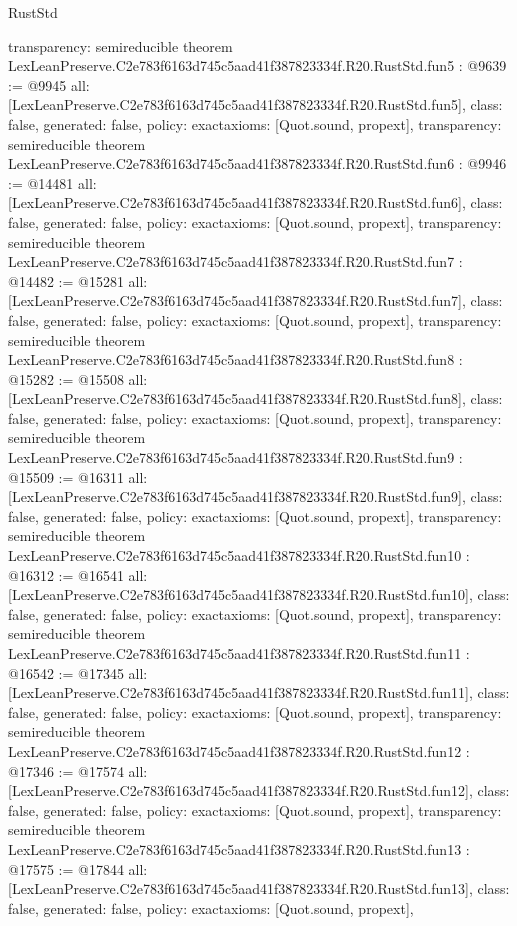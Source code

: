 \begin{lexlean}{RustStd}
\begin{coremodule}
{  transparency: semireducible
}
theorem LexLeanPreserve.C2e783f6163d745c5aad41f387823334f.R20.RustStd.fun5 : @9639 := @9945 {
  all: [LexLeanPreserve.C2e783f6163d745c5aad41f387823334f.R20.RustStd.fun5],
  class: false,
  generated: false,
  policy: exact{axioms: [Quot.sound, propext]},
  transparency: semireducible
}
theorem LexLeanPreserve.C2e783f6163d745c5aad41f387823334f.R20.RustStd.fun6 : @9946 := @14481 {
  all: [LexLeanPreserve.C2e783f6163d745c5aad41f387823334f.R20.RustStd.fun6],
  class: false,
  generated: false,
  policy: exact{axioms: [Quot.sound, propext]},
  transparency: semireducible
}
theorem LexLeanPreserve.C2e783f6163d745c5aad41f387823334f.R20.RustStd.fun7 : @14482 := @15281 {
  all: [LexLeanPreserve.C2e783f6163d745c5aad41f387823334f.R20.RustStd.fun7],
  class: false,
  generated: false,
  policy: exact{axioms: [Quot.sound, propext]},
  transparency: semireducible
}
theorem LexLeanPreserve.C2e783f6163d745c5aad41f387823334f.R20.RustStd.fun8 : @15282 := @15508 {
  all: [LexLeanPreserve.C2e783f6163d745c5aad41f387823334f.R20.RustStd.fun8],
  class: false,
  generated: false,
  policy: exact{axioms: [Quot.sound, propext]},
  transparency: semireducible
}
theorem LexLeanPreserve.C2e783f6163d745c5aad41f387823334f.R20.RustStd.fun9 : @15509 := @16311 {
  all: [LexLeanPreserve.C2e783f6163d745c5aad41f387823334f.R20.RustStd.fun9],
  class: false,
  generated: false,
  policy: exact{axioms: [Quot.sound, propext]},
  transparency: semireducible
}
theorem LexLeanPreserve.C2e783f6163d745c5aad41f387823334f.R20.RustStd.fun10 : @16312 := @16541 {
  all: [LexLeanPreserve.C2e783f6163d745c5aad41f387823334f.R20.RustStd.fun10],
  class: false,
  generated: false,
  policy: exact{axioms: [Quot.sound, propext]},
  transparency: semireducible
}
theorem LexLeanPreserve.C2e783f6163d745c5aad41f387823334f.R20.RustStd.fun11 : @16542 := @17345 {
  all: [LexLeanPreserve.C2e783f6163d745c5aad41f387823334f.R20.RustStd.fun11],
  class: false,
  generated: false,
  policy: exact{axioms: [Quot.sound, propext]},
  transparency: semireducible
}
theorem LexLeanPreserve.C2e783f6163d745c5aad41f387823334f.R20.RustStd.fun12 : @17346 := @17574 {
  all: [LexLeanPreserve.C2e783f6163d745c5aad41f387823334f.R20.RustStd.fun12],
  class: false,
  generated: false,
  policy: exact{axioms: [Quot.sound, propext]},
  transparency: semireducible
}
theorem LexLeanPreserve.C2e783f6163d745c5aad41f387823334f.R20.RustStd.fun13 : @17575 := @17844 {
  all: [LexLeanPreserve.C2e783f6163d745c5aad41f387823334f.R20.RustStd.fun13],
  class: false,
  generated: false,
  policy: exact{axioms: [Quot.sound, propext]},
}
\end{coremodule}
\end{lexlean}
